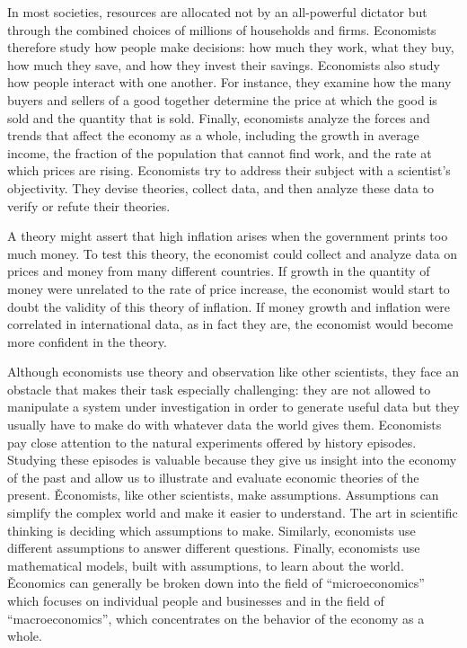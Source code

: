 In most societies, resources are allocated not by an all-powerful dictator but through the combined choices of
millions of households and firms. Economists therefore study how people make decisions: how much they work, what they
buy, how much they save, and how they invest their savings. Economists also study how people interact with one
another. For instance, they examine how the many buyers and sellers of a good together determine the price at which
the good is sold and the quantity that is sold. Finally, economists analyze the forces and trends that affect the
economy as a whole, including the growth in average income, the fraction of the population that cannot find work, and
the rate at which prices are rising. Economists try to address their subject with a scientist's objectivity. They
devise theories, collect data, and then analyze these data to verify or refute their theories.

\be
A theory might assert that high inflation arises when the government prints too much money. To test this theory, the
economist could collect and analyze data on prices and money from many different countries. If growth in the quantity
of money were unrelated to the rate of price increase, the economist would start to doubt the validity of this theory
of inflation. If money growth and inflation were correlated in international data, as in fact they are, the economist
would become more confident in the theory.
\ee

Although economists use theory and observation like other scientists, they face an obstacle that makes their task
especially challenging: they are not allowed to manipulate a system under investigation in order to generate useful
data but they usually have to make do with whatever data the world gives them. Economists pay close attention to the
natural experiments offered by history episodes. Studying these episodes is valuable because they give us insight
into the economy of the past and allow us to illustrate and evaluate economic theories of the present. \v

Economists, like other scientists, make assumptions. Assumptions can simplify the complex world and make it easier to
understand. The art in scientific thinking is deciding which assumptions to make. Similarly, economists use different
assumptions to answer different questions. Finally, economists use mathematical models, built with assumptions, to
learn about the world. \v

Economics can generally be broken down into the field of ``microeconomics'' which focuses on individual people and
businesses and in the field of ``macroeconomics'', which concentrates on the behavior of the economy as a whole.

